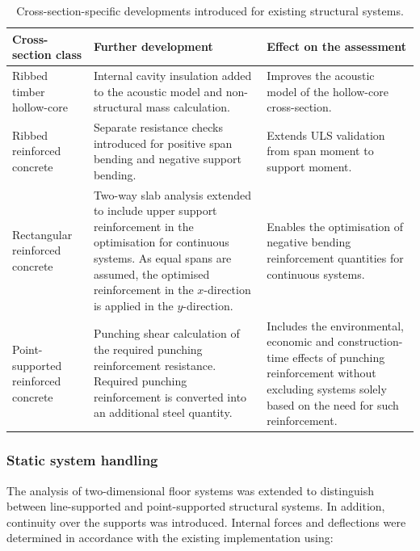 \begin{table}[h]
    \centering
    \begingroup
    \scriptsize
    \caption{Cross-section-specific developments introduced for existing structural systems.}
    \label{tab:existing_system_developments}
    \setlength{\tabcolsep}{3pt}
    \renewcommand{\arraystretch}{1.15}
    \begin{tabularx}{\textwidth}{@{}
        >{\raggedright\arraybackslash}p{3.2cm}
        |>{\raggedright\arraybackslash}X
        |>{\raggedright\arraybackslash}X@{}}
    \hline
    \textbf{Cross-section class} &
    \textbf{Further development} &
    \textbf{Effect on the assessment} \\
    \hline

    Ribbed timber hollow-core &
    Internal cavity insulation added to the acoustic model and non-structural mass calculation. &
    Improves the acoustic model of the hollow-core cross-section.\\

    Ribbed reinforced concrete &
    Separate resistance checks introduced for positive span bending and negative support bending.  &
    Extends ULS validation from span moment to support moment.  \\

    Rectangular reinforced concrete &
    Two-way slab analysis extended to include upper support reinforcement in the optimisation for continuous systems. As equal spans are assumed, the optimised reinforcement in the \(x\)-direction is applied in the \(y\)-direction. &
    Enables the optimisation of negative bending reinforcement quantities for continuous systems. \\

    Point-supported reinforced concrete &
    Punching shear calculation of the required punching reinforcement resistance. Required punching reinforcement is converted into an additional steel quantity. &
    Includes the environmental, economic and construction-time effects of punching reinforcement without excluding systems solely based on the need for such reinforcement. \\

    \hline
    \end{tabularx}
    \endgroup
    
\end{table}

\subsubsection{Static system handling}
The analysis of two-dimensional floor systems was extended to distinguish between line-supported and point-supported structural systems. In addition, continuity over the supports was introduced. Internal forces and deflections were determined in accordance with the existing implementation using:

